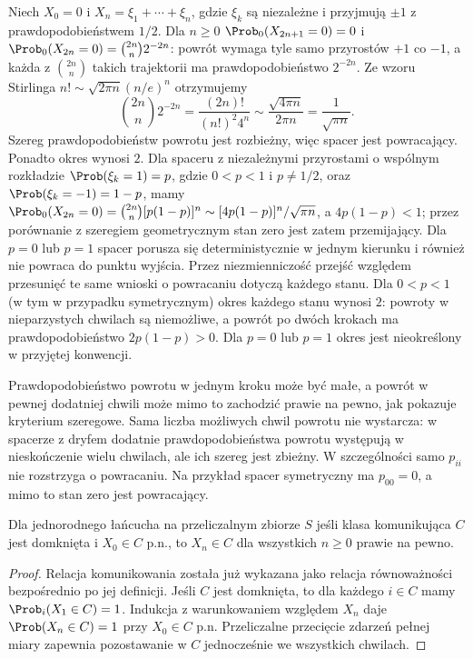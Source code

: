 \begin{przyklad}
Niech $X_0=0$ i $X_n=\xi_1+\cdots+\xi_n$,
gdzie $\xi_k$ są niezależne i przyjmują $\pm1$
z prawdopodobieństwem $1/2$. Dla $n\geq0$
$\Prob_0(X_{2n+1}=0)=0$ i
$\Prob_0(X_{2n}=0)=\binom{2n}{n}2^{-2n}$:
powrót wymaga tyle samo przyrostów $+1$ co $-1$,
a każda z $\binom{2n}{n}$ takich trajektorii ma
prawdopodobieństwo $2^{-2n}$.
Ze wzoru Stirlinga
$n!\sim\sqrt{2\pi n}(n/e)^n$ otrzymujemy
\[
\binom{2n}{n}2^{-2n}
=\frac{(2n)!}{(n!)^2 4^n}
\sim\frac{\sqrt{4\pi n}}{2\pi n}
=\frac{1}{\sqrt{\pi n}}.
\]
Szereg prawdopodobieństw powrotu jest rozbieżny,
więc spacer jest powracający. Ponadto okres wynosi $2$.
Dla spaceru z niezależnymi przyrostami o wspólnym
rozkładzie $\Prob(\xi_k=1)=p$, gdzie $0<p<1$
i $p\ne1/2$, oraz $\Prob(\xi_k=-1)=1-p$,
mamy
$\Prob_0(X_{2n}=0)=\binom{2n}{n}[p(1-p)]^n
\sim[4p(1-p)]^n/\sqrt{\pi n}$,
a $4p(1-p)<1$; przez porównanie z szeregiem
geometrycznym stan zero jest zatem przemijający.
Dla $p=0$ lub $p=1$ spacer porusza się
deterministycznie w jednym kierunku i również
nie powraca do punktu wyjścia.
Przez niezmienniczość przejść względem przesunięć
te same wnioski o powracaniu dotyczą każdego stanu.
Dla $0<p<1$ (w tym w przypadku symetrycznym)
okres każdego stanu wynosi $2$: powroty
w nieparzystych chwilach są niemożliwe, a powrót
po dwóch krokach ma prawdopodobieństwo $2p(1-p)>0$.
Dla $p=0$ lub $p=1$ okres jest nieokreślony
w przyjętej konwencji.
\end{przyklad}

\begin{przyklad}
Prawdopodobieństwo powrotu w jednym kroku może
być małe, a powrót w pewnej dodatniej chwili może
mimo to zachodzić prawie na pewno,
jak pokazuje kryterium szeregowe.
Sama liczba możliwych chwil powrotu nie wystarcza:
w spacerze z dryfem dodatnie prawdopodobieństwa
powrotu występują w nieskończenie wielu chwilach,
ale ich szereg jest zbieżny. W szczególności
samo $p_{ii}$ nie rozstrzyga o powracaniu.
Na przykład spacer symetryczny ma $p_{00}=0$,
a mimo to stan zero jest powracający.
\end{przyklad}


\begin{stwierdzenie}
Dla jednorodnego łańcucha na przeliczalnym zbiorze $S$
jeśli klasa komunikująca $C$ jest domknięta i
$X_0\in C$ p.n., to $X_n\in C$ dla wszystkich
$n\geq0$ prawie na pewno.
\end{stwierdzenie}
\begin{proof}
Relacja komunikowania została już wykazana
jako relacja równoważności bezpośrednio po jej definicji.
Jeśli $C$ jest domknięta, to dla każdego
$i\in C$ mamy $\Prob_i(X_1\in C)=1$.
Indukcja z warunkowaniem względem $X_n$
daje $\Prob(X_n\in C)=1$ przy $X_0\in C$ p.n.
Przeliczalne przecięcie zdarzeń pełnej miary
zapewnia pozostawanie w $C$ jednocześnie
we wszystkich chwilach.
\end{proof}

